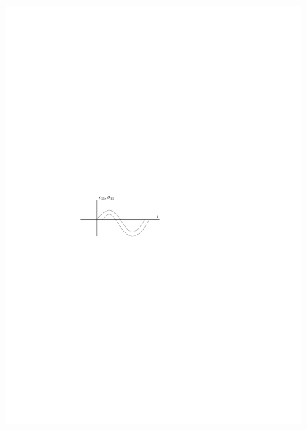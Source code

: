 \documentclass[a4paper, 12pt, brazilian]{article}
\begin{document}
\begin{itemize}
		\begin{figure}[H]
			\includegraphics[scale=1.3]{images/elast}

\end{figure}
\end{itemize}
\end{document}
